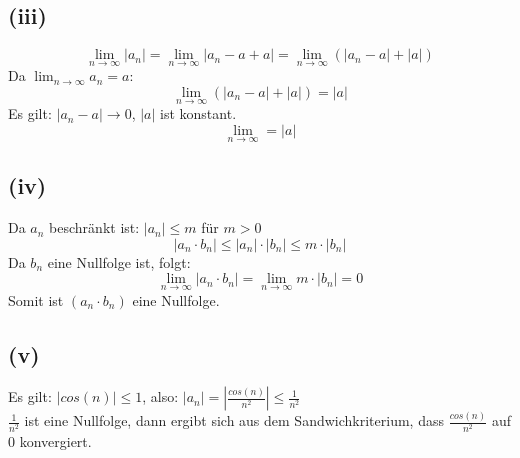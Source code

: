 \documentclass{article}
\begin{document}
\subsection{(iii)}
\[\lim_{n\to\infty}|a_n| = \lim_{n\to\infty}|a_n - a + a| = \lim_{n\to\infty}(|a_n-a| + |a|)\]
Da $\lim_{n\to\infty} a_n = a$: 
\[\lim_{n\to\infty}(|a_n-a| + |a|) = |a|\]
Es gilt: $|a_n - a| \to 0$, $|a|$ ist konstant.
\[\lim_{n\to\infty} = |a|\]

\subsection{(iv)}
Da $a_n$ beschränkt ist: $|a_n| \leq m$ für $m > 0$
\[|a_n \cdot b_n| \leq |a_n| \cdot |b_n| \leq m \cdot |b_n|\]
Da $b_n$ eine Nullfolge ist, folgt:
\[\lim_{n\to\infty}|a_n \cdot b_n| = \lim_{n\to\infty} m \cdot |b_n| = 0\]
Somit ist $(a_n \cdot b_n)$ eine Nullfolge.

\subsection{(v)}
Es gilt: $|cos(n)| \leq 1$, also: $|a_n| = \left|\frac{cos(n)}{n^2}\right| \leq \frac{1}{n^2}$ \\
\newline
$\frac{1}{n^2}$ ist eine Nullfolge, dann ergibt sich aus dem Sandwichkriterium, dass $\frac{cos(n)}{n^2}$ auf 0 konvergiert.
\end{document}
